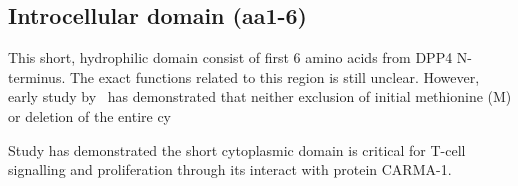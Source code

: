 \subsection{Introcellular domain (aa1-6)}

This short, hydrophilic domain consist of first 6 amino acids from DPP4 N-terminus. The exact functions related to this region is still unclear. However, early study by~\citet{Hong1990} has demonstrated that neither exclusion of initial methionine (M) or deletion of the entire cy

Study has demonstrated the short cytoplasmic domain is critical for T-cell signalling and proliferation through its interact with protein CARMA-1. \cite{Ohnuma_2007}